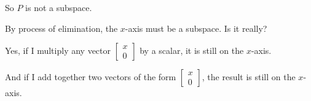 \documentclass{ximera}
\begin{document}
\begin{question}
\begin{solution}
    \begin{hint}
      So $P$ is not a subspace.
    \end{hint}

    \begin{hint}
      By process of elimination, the $x$-axis must be a subspace.  Is it really?
    \end{hint}

    \begin{hint}
      Yes, if I multiply any vector $\begin{bmatrix} x \\ 0 \end{bmatrix}$ by a scalar, it is still on the $x$-axis.
    \end{hint}

    \begin{hint}
      And if I add together two vectors of the form $\begin{bmatrix} x \\ 0 \end{bmatrix}$, the result is still on the $x$-axis.
    \end{hint}

    \begin{multiple-choice}
    \end{multiple-choice}
  \end{solution}
  

\end{question}
\end{document}
